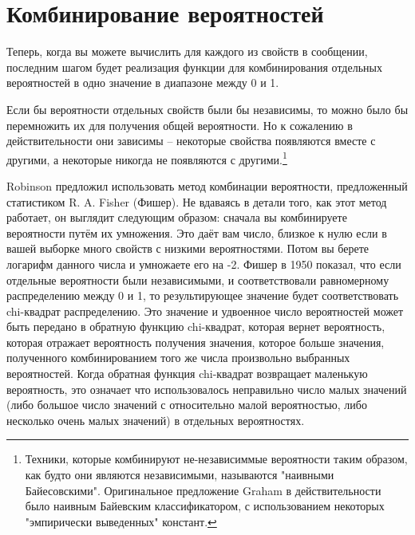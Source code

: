 \section{Комбинирование вероятностей}

Теперь, когда вы можете вычислить  для каждого из свойств
в сообщении, последним шагом будет реализация функции  для комбинирования
отдельных вероятностей в одно значение в диапазоне между 0 и 1.

Если бы вероятности отдельных свойств были бы независимы, то можно было бы перемножить их
для получения общей вероятности.  Но к сожалению в действительности они зависимы --
некоторые свойства появляются вместе с другими, а некоторые никогда не появляются с
другими.\footnote{Техники, которые комбинируют не-независиммые вероятности таким образом,
  как будто они являются независимыми, называются "наивными Байесовскими".  Оригинальное
  предложение Graham в действительности было наивным Байевским классификатором, с
  использованием некоторых "эмпирически выведенных" констант.}

Robinson предложил использовать метод комбинации вероятности, предложенный статистиком
R. A. Fisher (Фишер).  Не вдаваясь в детали того, как этот метод работает, он выглядит
следующим образом: сначала вы комбинируете вероятности путём их умножения.  Это даёт вам
число, близкое к нулю если в вашей выборке много свойств с низкими вероятностями.  Потом
вы берете логарифм данного числа и умножаете его на -2.  Фишер в 1950 показал, что если
отдельные вероятности были независимыми, и соответствовали равномерному распределению
между 0 и 1, то результирующее значение будет соответствовать chi-квадрат
распределению. Это значение и удвоенное число вероятностей может быть передано в обратную
функцию chi-квадрат, которая вернет вероятность, которая отражает вероятность получения
значения, которое больше значения, полученного комбинированием того же числа произвольно
выбранных вероятностей.  Когда обратная функция chi-квадрат возвращает маленькую
вероятность, это означает что использовалось неправильно число малых значений (либо
большое число значений с относительно малой вероятностью, либо несколько очень малых
значений) в отдельных вероятностях.

